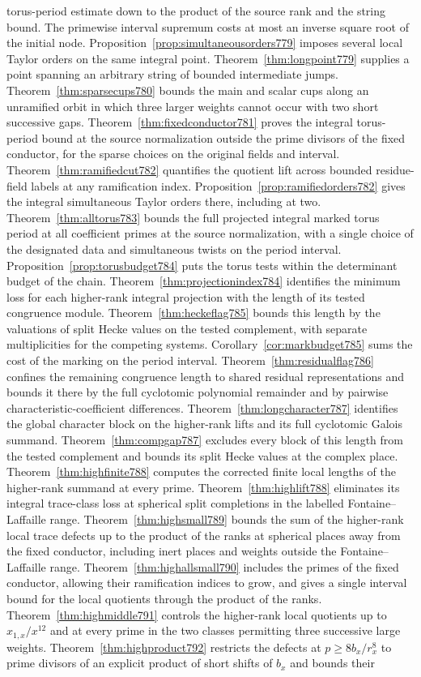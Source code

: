 \documentclass[a4paper,11pt]{article}
\theoremstyle{definition}
\theoremstyle{remark}
\numberwithin{equation}{section}
\begin{document}
torus-period estimate down to the product of the source rank and the string bound. The primewise interval supremum costs at most an inverse square root of the initial node. Proposition~\ref{prop:simultaneousorders779} imposes several local Taylor orders on the same integral point. Theorem~\ref{thm:longpoint779} supplies a point spanning an arbitrary string of bounded intermediate jumps. Theorem~\ref{thm:sparsecups780} bounds the main and scalar cups along an unramified orbit in which three larger weights cannot occur with two short successive gaps. Theorem~\ref{thm:fixedconductor781} proves the integral torus-period bound at the source normalization outside the prime divisors of the fixed conductor, for the sparse choices on the original fields and interval. Theorem~\ref{thm:ramifiedcut782} quantifies the quotient lift across bounded residue-field labels at any ramification index. Proposition~\ref{prop:ramifiedorders782} gives the integral simultaneous Taylor orders there, including at two. Theorem~\ref{thm:alltorus783} bounds the full projected integral marked torus period at all coefficient primes at the source normalization, with a single choice of the designated data and simultaneous twists on the period interval. Proposition~\ref{prop:torusbudget784} puts the torus tests within the determinant budget of the chain. Theorem~\ref{thm:projectionindex784} identifies the minimum loss for each higher-rank integral projection with the length of its tested congruence module. Theorem~\ref{thm:heckeflag785} bounds this length by the valuations of split Hecke values on the tested complement, with separate multiplicities for the competing systems. Corollary~\ref{cor:markbudget785} sums the cost of the marking on the period interval. Theorem~\ref{thm:residualflag786} confines the remaining congruence length to shared residual representations and bounds it there by the full cyclotomic polynomial remainder and by pairwise characteristic-coefficient differences. Theorem~\ref{thm:longcharacter787} identifies the global character block on the higher-rank lifts and its full cyclotomic Galois summand. Theorem~\ref{thm:compgap787} excludes every block of this length from the tested complement and bounds its split Hecke values at the complex place. Theorem~\ref{thm:highfinite788} computes the corrected finite local lengths of the higher-rank summand at every prime. Theorem~\ref{thm:highlift788} eliminates its integral trace-class loss at spherical split completions in the labelled Fontaine--Laffaille range. Theorem~\ref{thm:highsmall789} bounds the sum of the higher-rank local trace defects up to the product of the ranks at spherical places away from the fixed conductor, including inert places and weights outside the Fontaine--Laffaille range. Theorem~\ref{thm:highallsmall790} includes the primes of the fixed conductor, allowing their ramification indices to grow, and gives a single interval bound for the local quotients through the product of the ranks. Theorem~\ref{thm:highmiddle791} controls the higher-rank local quotients up to \(x_{1,x}/x^{12}\) and at every prime in the two classes permitting three successive large weights. Theorem~\ref{thm:highproduct792} restricts the defects at \(p\ge 8b_x/r_x^8\) to prime divisors of an explicit product of short shifts of \(b_x\) and bounds their 
\end{document}
